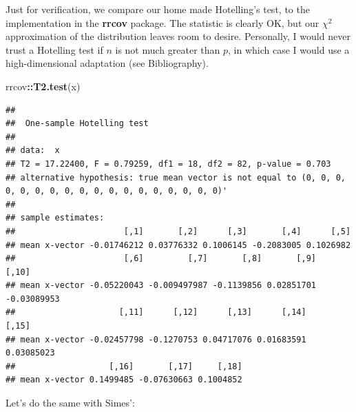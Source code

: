\documentclass[]{book}
\newenvironment{Shaded}{\begin{snugshade}}{\end{snugshade}}
\newcommand{\CommentTok}[1]{\textcolor[rgb]{0.56,0.35,0.01}{\textit{#1}}}
\newcommand{\ControlFlowTok}[1]{\textcolor[rgb]{0.13,0.29,0.53}{\textbf{#1}}}
\newcommand{\DataTypeTok}[1]{\textcolor[rgb]{0.13,0.29,0.53}{#1}}
\newcommand{\DecValTok}[1]{\textcolor[rgb]{0.00,0.00,0.81}{#1}}
\newcommand{\KeywordTok}[1]{\textcolor[rgb]{0.13,0.29,0.53}{\textbf{#1}}}
\newcommand{\NormalTok}[1]{#1}
\newcommand{\OperatorTok}[1]{\textcolor[rgb]{0.81,0.36,0.00}{\textbf{#1}}}
\newcommand{\StringTok}[1]{\textcolor[rgb]{0.31,0.60,0.02}{#1}}
\theoremstyle{definition}
\theoremstyle{definition}
\theoremstyle{definition}
\theoremstyle{remark}
\begin{document}
Just for verification, we compare our home made Hotelling's test, to the implementation in the \textbf{rrcov} package.
The statistic is clearly OK, but our \(\chi^2\) approximation of the distribution leaves room to desire.
Personally, I would never trust a Hotelling test if \(n\) is not much greater than \(p\), in which case I would use a high-dimensional adaptation (see Bibliography).

\begin{Shaded}
\begin{Highlighting}[]
\NormalTok{rrcov}\OperatorTok{::}\KeywordTok{T2.test}\NormalTok{(x)}
\end{Highlighting}
\end{Shaded}

\begin{verbatim}
## 
##  One-sample Hotelling test
## 
## data:  x
## T2 = 17.22400, F = 0.79259, df1 = 18, df2 = 82, p-value = 0.703
## alternative hypothesis: true mean vector is not equal to (0, 0, 0, 0, 0, 0, 0, 0, 0, 0, 0, 0, 0, 0, 0, 0, 0, 0)' 
## 
## sample estimates:
##                      [,1]       [,2]      [,3]       [,4]      [,5]
## mean x-vector -0.01746212 0.03776332 0.1006145 -0.2083005 0.1026982
##                      [,6]         [,7]       [,8]       [,9]       [,10]
## mean x-vector -0.05220043 -0.009497987 -0.1139856 0.02851701 -0.03089953
##                     [,11]      [,12]      [,13]      [,14]      [,15]
## mean x-vector -0.02457798 -0.1270753 0.04717076 0.01683591 0.03085023
##                   [,16]       [,17]     [,18]
## mean x-vector 0.1499485 -0.07630663 0.1004852
\end{verbatim}

Let's do the same with Simes':

\begin{Shaded}
\end{Shaded}
\end{document}
